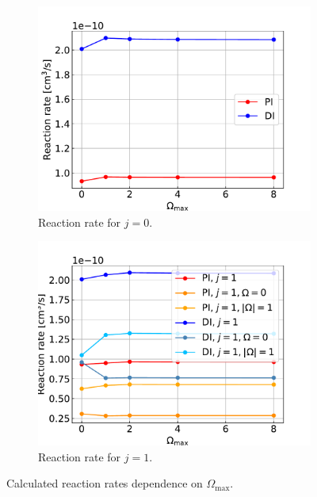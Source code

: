 \documentclass{article}
\begin{document}
    \begin{figure}[H]
        \centering
        \begin{subfigure}{.4\linewidth}
            \centering
            \includegraphics[width=\linewidth]{coriolis_rr_omega_maxes_0.pdf}
            \caption{Reaction rate for $j = 0$.}
        \end{subfigure}
        \begin{subfigure}{.4\linewidth}
            \centering
            \includegraphics[width=\linewidth]{coriolis_rr_omega_maxes_1.pdf}
            \caption{Reaction rate for $j = 1$.}
        \end{subfigure}     
        \caption{Calculated reaction rates dependence on $\Omega_\text{max}$.}
    \end{figure}
\end{document}
